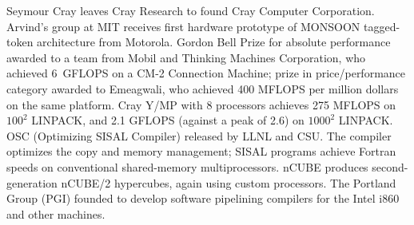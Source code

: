 	{Seymour Cray leaves Cray Research to found
	Cray Computer Corporation.}
	{Arvind's group at MIT receives first hardware prototype of
	MONSOON tagged-token architecture from Motorola.}
	{Gordon Bell Prize for absolute performance awarded to
	a team from Mobil and Thinking Machines Corporation,
	who achieved 6~GFLOPS on a CM-2 Connection Machine;
	prize in price/performance category awarded to Emeagwali,
	who achieved 400 MFLOPS per million dollars on the same platform.}
	{Cray Y/MP with 8 processors achieves 275 MFLOPS
	on $100^2$ LINPACK,
	and 2.1 GFLOPS (against a peak of 2.6)
	on $1000^2$ LINPACK.}
	{OSC (Optimizing SISAL Compiler) released by LLNL and CSU.
	The compiler optimizes the copy and memory management;
	SISAL programs achieve Fortran speeds on conventional
	shared-memory multiprocessors.}
	{nCUBE produces second-generation nCUBE/2 hypercubes,
	again using custom processors.}
	{The Portland Group (PGI) founded to develop software
	pipelining compilers
	for the Intel i860 and other machines.}

